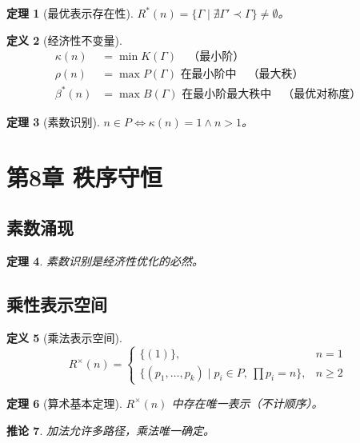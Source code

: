 \documentclass[12pt]{article}
\newtheorem{theorem}{定理}[section]
\newtheorem{corollary}[theorem]{推论}
\theoremstyle{definition}
\newtheorem{definition}[theorem]{定义}
\begin{document}
\begin{theorem}[最优表示存在性]
\(R^*(n) = \{\Gamma \mid \nexists \Gamma' \prec \Gamma\} \neq \emptyset\)。
\end{theorem}

\begin{definition}[经济性不变量]
\begin{align*}
\kappa(n) &= \min K(\Gamma) \quad \text{（最小阶）} \\
\rho(n) &= \max P(\Gamma) \text{ 在最小阶中} \quad \text{（最大秩）} \\
\beta^*(n) &= \max B(\Gamma) \text{ 在最小阶最大秩中} \quad \text{（最优对称度）}
\end{align*}
\end{definition}

\begin{theorem}[素数识别]
\(n \in P \iff \kappa(n) = 1 \land n > 1\)。
\end{theorem}

\section{第8章 秩序守恒}

\subsection{素数涌现}

\begin{theorem}
素数识别是经济性优化的必然。
\end{theorem}

\subsection{乘性表示空间}

\begin{definition}[乘法表示空间]
\[
R^{\times}(n) =
\begin{cases}
\{(1)\}, & n = 1 \\
\{(p_1,\dots,p_k) \mid p_i \in P,\ \prod p_i = n\}, & n \geq 2
\end{cases}
\]
\end{definition}

\begin{theorem}[算术基本定理]
\(R^{\times}(n)\) 中存在唯一表示（不计顺序）。
\end{theorem}

\begin{corollary}
加法允许多路径，乘法唯一确定。
\end{corollary}
\end{document}
